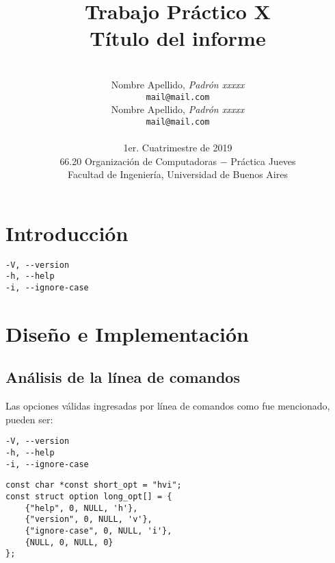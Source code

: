 \documentclass[a4paper, 10pt, twoside, notitlepage]{article}
\title{\textbf{Trabajo Práctico X\\Título del informe} \\}
\author{ \\
         Nombre Apellido, \textit{Padrón xxxxx} \\
          \texttt{ mail@mail.com }       \\
		  [2.5ex]
         Nombre Apellido, \textit{Padrón xxxxx}     \\
          \texttt{mail@mail.com}                      \\ 
		  [2.5ex]
		 \\
         \normalsize{1er. Cuatrimestre de 2019}            \\
         \normalsize{66.20 Organización de Computadoras $-$ Práctica Jueves} \\
         \normalsize{Facultad de Ingeniería, Universidad de Buenos Aires} 
       }
\date{}
\begin{document}
\maketitle

\begin{abstract}
\lipsum[3-3]
\end{abstract}

% 
% 

\pagestyle{fancy}
\fancyhead{}
\fancyfoot{}
\renewcommand{\sectionmark}[1]{\markright{\thesection\ #1}}
\renewcommand{\headrulewidth}{0.4pt}
\fancyhead[LE]{\nouppercase \rightmark}
\fancyhead[RE, LO]{\bf \thepage}
\fancyhead[RO]{\nouppercase \rightmark}
\fancyfoot[C]{ }
\maketitle
\setcounter{page}{1}

\parskip 7.2pt

\section{Introducción}
\lipsum[3-3]


\begin{verbatim}
-V, --version
-h, --help
-i, --ignore-case 
\end{verbatim}


\section{Diseño e Implementación}
\subsection{Análisis de la línea de comandos}
Las opciones válidas ingresadas por línea de comandos como fue mencionado, pueden ser:

\begin{verbatim}
-V, --version
-h, --help
-i, --ignore-case 
\end{verbatim}

\lipsum[3-3]


\begin{verbatim}
const char *const short_opt = "hvi";
const struct option long_opt[] = {
    {"help", 0, NULL, 'h'},
    {"version", 0, NULL, 'v'},
    {"ignore-case", 0, NULL, 'i'},
    {NULL, 0, NULL, 0}
};
\end{verbatim}
\end{document}
